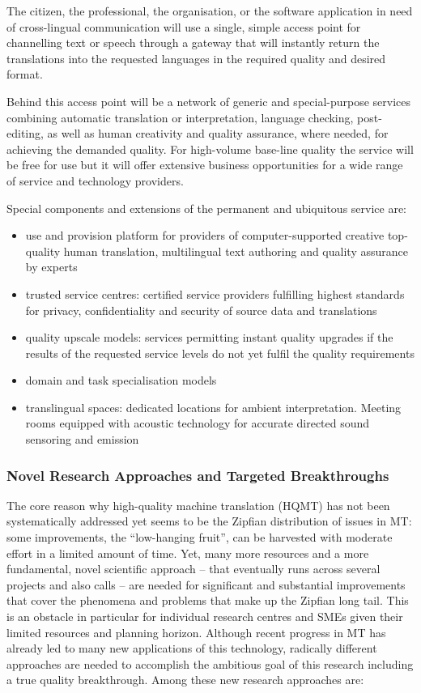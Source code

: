 \documentclass[10pt, plain]{../../metanetpaper}
\begin{document}
\begin{multicols}{2}
The citizen, the professional, the organisation, or the software application in need of cross-lingual communication will use a single, simple access point for channelling text or speech through a gateway that will instantly return the translations into the requested languages in the required quality and desired format.
 
Behind this access point will be a network of generic and special-purpose services combining automatic translation or interpretation, language checking, post-editing, as well as human creativity and quality assurance, where needed, for achieving the demanded quality. For high-volume base-line quality the service will be free for use but it will offer extensive business opportunities for a wide range of service and technology providers.

Special components and extensions of the permanent and ubiquitous service are:

\begin{itemize}
\item use and provision platform for providers of computer-supported creative top-quality human translation, multilingual text authoring and quality assurance by experts
\item trusted service centres: certified service providers fulfilling highest standards for privacy, confidentiality and security of source data and translations
\item quality upscale models: services permitting instant quality upgrades if the results of the requested service levels do not yet fulfil the quality requirements
\item domain and task specialisation models
\item translingual spaces: dedicated locations for ambient interpretation. Meeting rooms equipped with acoustic technology for accurate directed sound sensoring and emission
\end{itemize}

\subsubsection{Novel Research Approaches and Targeted Breakthroughs}
\label{sec:novel-rese-appr-pt1}

The core reason why high-quality machine translation (HQMT) has not been systematically addressed yet seems to be the Zipfian distribution of issues in MT: some improvements, the “low-hanging fruit”, can be harvested with moderate effort in a limited amount of time. Yet, many more resources and a more fundamental, novel scientific approach -- that eventually runs across several projects and also calls -- are needed for significant and substantial improvements that cover the phenomena and problems that make up the Zipfian long tail. This is an obstacle in particular for individual research centres and SMEs given their limited resources and planning horizon. Although recent progress in MT has already led to many new applications of this technology, radically different approaches are needed to accomplish the ambitious goal of this research including a true quality breakthrough. Among these new research approaches are:


\end{multicols}
\end{document}
